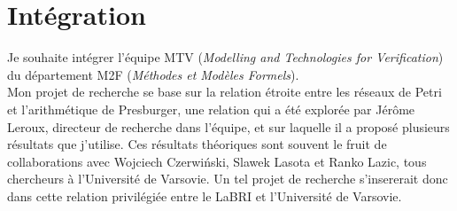 









\vspace{10pt}
\section*{Intégration}
\vspace{10pt}

Je souhaite intégrer l'équipe MTV (\emph{Modelling and Technologies for
Verification}) du département M2F (\emph{Méthodes et Modèles Formels}).\\

Mon projet de recherche se base sur la relation étroite entre les réseaux de
Petri et l'arithmétique de Presburger, une relation qui a été explorée par
Jérôme Leroux, directeur de recherche dans l'équipe, et sur laquelle il a
proposé plusieurs résultats que j'utilise. Ces résultats théoriques sont souvent
le fruit de collaborations avec Wojciech Czerwiński, Slawek Lasota et Ranko
Lazic, tous chercheurs à l'Université de Varsovie. Un tel projet de recherche
s'insererait donc dans cette relation privilégiée entre le LaBRI et l'Université
de Varsovie.\\

